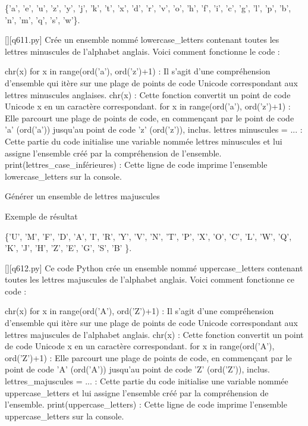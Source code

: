 \{'a', 'e', 'u', 'z', 'y', 'j', 'k', 't', 'x', 'd', 'r', 'v', 'o', 'h', 'f', 'i', 'c', 'g', 'l', 'p', 'b', 'n', 'm', 'q', 's', 'w'\}.
        \par
        \begin{solution}
            \renewcommand{\nomfichier}{q611.py}
            \pythonfile{\chemincode \nomfichier}[][\nomfichier]
            Crée un ensemble nommé lowercase_letters contenant toutes les lettres minuscules de l'alphabet anglais. Voici comment fonctionne le code :

    {chr(x) for x in range(ord('a'), ord('z')+1)} : Il s'agit d'une compréhension d'ensemble qui itère sur une plage de points de code Unicode correspondant aux lettres minuscules anglaises.
        chr(x) : Cette fonction convertit un point de code Unicode x en un caractère correspondant.
        for x in range(ord('a'), ord('z')+1) : Elle parcourt une plage de points de code, en commençant par le point de code 'a' (ord('a')) jusqu'au point de code 'z' (ord('z')), inclus.
    lettres minuscules = {...} : Cette partie du code initialise une variable nommée lettres minuscules et lui assigne l'ensemble créé par la compréhension de l'ensemble.
    print(lettres_case_inférieures) : Cette ligne de code imprime l'ensemble lowercase_letters sur la console.
        \end{solution}
        

        \question
        Générer un ensemble de lettres majuscules

Exemple de résultat

\{'U', 'M', 'F', 'D', 'A', 'I', 'R', 'Y', 'V', 'N', 'T', 'P', 'X', 'O', 'C', 'L', 'W', 'Q', 'K', 'J', 'H', 'Z', 'E', 'G', 'S', 'B' \}.
        \par
        \begin{solution}
            \renewcommand{\nomfichier}{q612.py}
            \pythonfile{\chemincode \nomfichier}[][\nomfichier]
            Ce code Python crée un ensemble nommé uppercase_letters contenant toutes les lettres majuscules de l'alphabet anglais. Voici comment fonctionne ce code :

    {chr(x) for x in range(ord('A'), ord('Z')+1)} : Il s'agit d'une compréhension d'ensemble qui itère sur une plage de points de code Unicode correspondant aux lettres majuscules de l'alphabet anglais.
        chr(x) : Cette fonction convertit un point de code Unicode x en un caractère correspondant.
        for x in range(ord('A'), ord('Z')+1) : Elle parcourt une plage de points de code, en commençant par le point de code 'A' (ord('A')) jusqu'au point de code 'Z' (ord('Z')), inclus.
    lettres_majuscules = {...} : Cette partie du code initialise une variable nommée uppercase_letters et lui assigne l'ensemble créé par la compréhension de l'ensemble.
    print(uppercase_letters) : Cette ligne de code imprime l'ensemble uppercase_letters sur la console.
        \end{solution}
        

